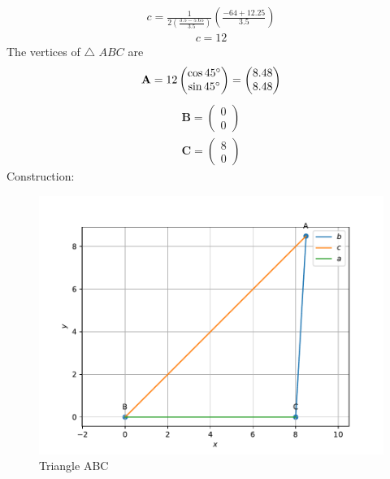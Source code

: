 \documentclass{article}
\newcommand{\myvec}[1]{\ensuremath{\begin{pmatrix}#1\end{pmatrix}}}
\let\vec\mathbf
\begin{document}
\begin{align}
       c
	 =
	 \frac{1}{2\left(\frac{3.5-5.65}{3.5}\right)}
	 \left(\frac{-64+12.25}{3.5}\right) 
     \end{align}
     \begin{align}
	 c = 12
      \end{align}		
The vertices of $\triangle$ $ABC$ are \\
\begin{align}
 \vec{A} = 12\myvec{\cos 45\degree\\\sin 45\degree}
         = \myvec{8.48\\8.48}
\end{align}
\begin{align}
 \vec{B} = \myvec{0\\0}\\
 \vec{C} = \myvec{8\\0}
 \end{align} 	      
Construction: \\
\begin{figure}[h]
 \begin{center}
	 \includegraphics[width=\columnwidth]{figs/triangle.pdf}
 \end{center}
 \caption{Triangle ABC}
 \label{fig:Fig1}
\end{figure}
\end{document}
